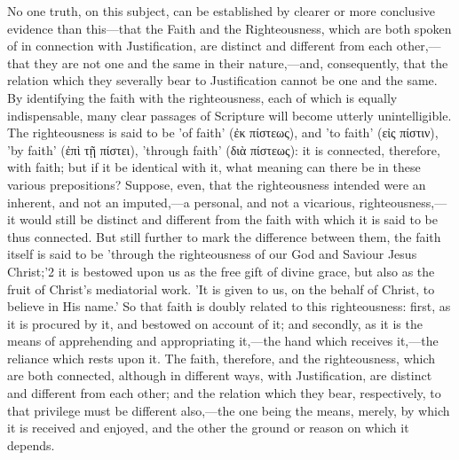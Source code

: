 \documentclass[
]{book}
\begin{document}
No one truth, on this subject, can be established by clearer or more conclusive evidence than this---that the Faith and the Righteousness, which are both spoken of in connection with Justification, are distinct and different from each other,---that they are not one and the same in their nature,---and, consequently, that the relation which they severally bear to Justification cannot be one and the same. By identifying the faith with the righteousness, each of which is equally indispensable, many clear passages of Scripture will become utterly unintelligible. The righteousness is said to be 'of faith' (ἐκ πίστεως), and 'to faith' (εἰς πίστιν), 'by faith' (ἐπὶ τῇ πίστει), 'through faith' (διὰ πίστεως): it is connected, therefore, with faith; but if it be identical with it, what meaning can there be in these various prepositions? Suppose, even, that the righteousness intended were an inherent, and not an imputed,---a personal, and not a vicarious, righteousness,---it would still be distinct and different from the faith with which it is said to be thus connected. But still further to mark the difference between them, the faith itself is said to be 'through the righteousness of our God and Saviour Jesus Christ;'2 it is bestowed upon us as the free gift of divine grace, but also as the fruit of Christ's mediatorial work. 'It is given to us, on the behalf of Christ, to believe in His name.' So that faith is doubly related to this righteousness: first, as it is procured by it, and bestowed on account of it; and secondly, as it is the means of apprehending and appropriating it,---the hand which receives it,---the reliance which rests upon it. The faith, therefore, and the righteousness, which are both connected, although in different ways, with Justification, are distinct and different from each other; and the relation which they bear, respectively, to that privilege must be different also,---the one being the means, merely, by which it is received and enjoyed, and the other the ground or reason on which it depends.
\end{document}
